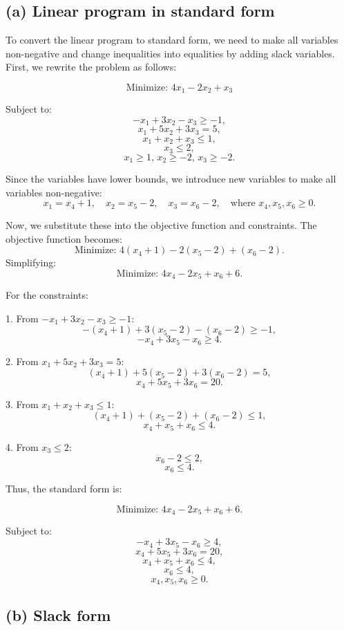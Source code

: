 \documentclass[10pt,letter,notitlepage]{article}
\begin{document}
\begin{Answer}[]

\subsection*{(a) Linear program in standard form}

To convert the linear program to standard form, we need to make all variables non-negative and change inequalities into equalities by adding slack variables. First, we rewrite the problem as follows:

\[
\text{Minimize: } 4x_1 - 2x_2 + x_3
\]

Subject to:
\[
-x_1 + 3x_2 - x_3 \geq -1,
\]
\[
x_1 + 5x_2 + 3x_3 = 5,
\]
\[
x_1 + x_2 + x_3 \leq 1,
\]
\[
x_3 \leq 2,
\]
\[
x_1 \geq 1, \, x_2 \geq -2, \, x_3 \geq -2.
\]

Since the variables have lower bounds, we introduce new variables to make all variables non-negative:
\[
x_1 = x_4 + 1, \quad x_2 = x_5 - 2, \quad x_3 = x_6 - 2, \quad \text{where } x_4, x_5, x_6 \geq 0.
\]

Now, we substitute these into the objective function and constraints. The objective function becomes:
\[
\text{Minimize: } 4(x_4 + 1) - 2(x_5 - 2) + (x_6 - 2).
\]
Simplifying:
\[
\text{Minimize: } 4x_4 - 2x_5 + x_6 + 6.
\]

For the constraints:

1. From \(-x_1 + 3x_2 - x_3 \geq -1\):
\[
-(x_4 + 1) + 3(x_5 - 2) - (x_6 - 2) \geq -1,
\]
\[
-x_4 + 3x_5 - x_6 \geq 4.
\]

2. From \(x_1 + 5x_2 + 3x_3 = 5\):
\[
(x_4 + 1) + 5(x_5 - 2) + 3(x_6 - 2) = 5,
\]
\[
x_4 + 5x_5 + 3x_6 = 20.
\]

3. From \(x_1 + x_2 + x_3 \leq 1\):
\[
(x_4 + 1) + (x_5 - 2) + (x_6 - 2) \leq 1,
\]
\[
x_4 + x_5 + x_6 \leq 4.
\]

4. From \(x_3 \leq 2\):
\[
x_6 - 2 \leq 2,
\]
\[
x_6 \leq 4.
\]

Thus, the standard form is:

\[
\text{Minimize: } 4x_4 - 2x_5 + x_6 + 6.
\]

Subject to:
\[
-x_4 + 3x_5 - x_6 \geq 4,
\]
\[
x_4 + 5x_5 + 3x_6 = 20,
\]
\[
x_4 + x_5 + x_6 \leq 4,
\]
\[
x_6 \leq 4,
\]
\[
x_4, x_5, x_6 \geq 0.
\]

\subsection*{(b) Slack form}


\end{Answer}
\end{document}
